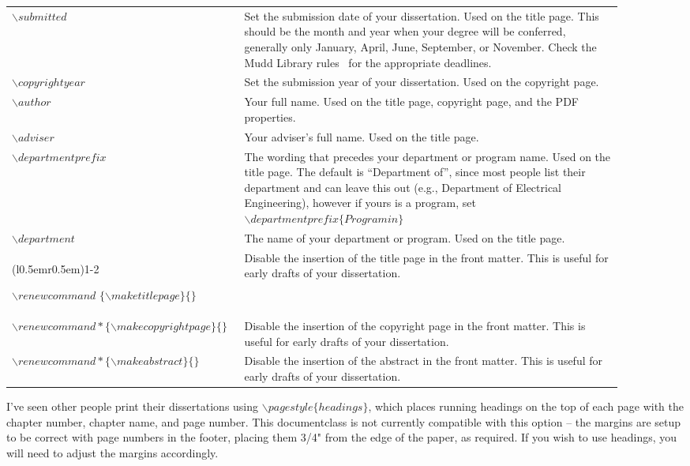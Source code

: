\begin{longtable}{p{0.3\linewidth} p{0.6\linewidth}}
  $\backslash submitted$ &
  Set the submission date of your dissertation. Used on the title page. This should be the month and year when your degree will be conferred, generally only January, April, June, September, or November. Check the Mudd Library rules~\cite{mudd2009} for the appropriate deadlines.
  \\

  $\backslash copyrightyear$ &
  Set the submission year of your dissertation. Used on the copyright page.
  \\

  $\backslash author$ &
  Your full name. Used on the title page, copyright page, and the PDF properties. \\

  $\backslash adviser$ &
  Your adviser's full name. Used on the title page. \\

  $\backslash departmentprefix$ &
  The wording that precedes your department or program name. Used on the title page. The default is ``Department of'', since most people list their department and can leave this out (e.g., Department of Electrical Engineering), however if yours is a program, set $\backslash departmentprefix\{Program in\}$ \\

  $\backslash department$ &
  The name of your department or program. Used on the title page. \\

  \cmidrule[0.1pt](l{0.5em}r{0.5em}){1-2}
  
  \raggedright  
  $\backslash renewcommand$ $\{\backslash maketitlepage\}\{\}$ &
  Disable the insertion of the title page in the front matter. This is useful for early drafts of your dissertation. \\

  \raggedright  %
  $\backslash renewcommand*\{\backslash makecopyrightpage\}\{\}$ &
  Disable the insertion of the copyright page in the front matter. This is useful for early drafts of your dissertation. \\

  \raggedright 
  $\backslash renewcommand*\{\backslash makeabstract\}\{\}$ &
  Disable the insertion of the abstract in the front matter. This is useful for early drafts of your dissertation. \\

\end{longtable}
\bodyspacing     %


I've seen other people print their dissertations using $\backslash pagestyle\{headings\}$, which places running headings on the top of each page with the chapter number, chapter name, and page number. This documentclass is not currently compatible with this option -- the margins are setup to be correct with page numbers in the footer, placing them 3/4" from the edge of the paper, as required. If you wish to use headings, you will need to adjust the margins accordingly.

